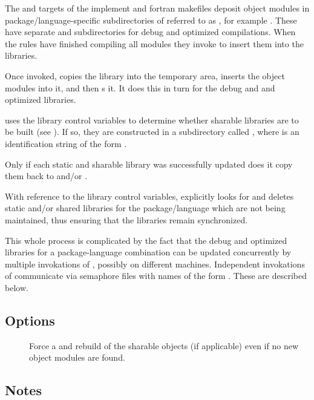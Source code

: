 The  and  targets of the implement and fortran
makefiles deposit object modules in package/language-specific subdirectories
of  referred to as , for example
.  These have separate  and 
subdirectories for debug and optimized compilations.  When the 
rules have finished compiling all modules they invoke  to
insert them into the libraries.

Once invoked,  copies the library into the temporary area,
inserts the object modules into it, and then s it.  It does
this in turn for the debug and and optimized libraries.

 uses the library control variables to determine whether
sharable libraries are to be built (see ).  If so, they are
constructed in a subdirectory called , where  is
an identification string of the form .

Only if each static and sharable library was successfully updated does it copy
them back to  and/or .

With reference to the library control variables,  explicitly
looks for and deletes static and/or shared libraries for the package/language
which are not being maintained, thus ensuring that the libraries remain
synchronized.

This whole process is complicated by the fact that the debug and optimized
libraries for a package-language combination can be updated concurrently by
multiple invokations of , possibly on different machines.
Independent invokations of  communicate via semaphore files
with names of the form .  These are described below.

\subsection*{Options}

\begin{description}
\item[]
   Force a  and rebuild of the sharable objects (if
   applicable) even if no new object modules are found.
\end{description}

\subsection*{Notes}

